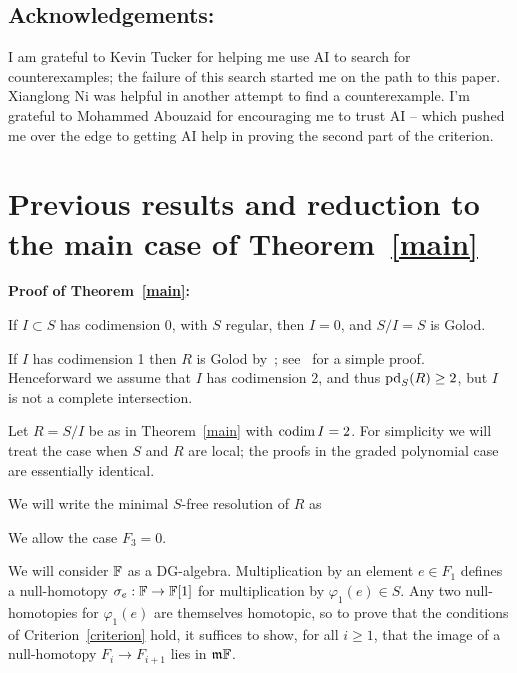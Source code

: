 \documentclass[11pt]{amsart}
\def\phi{{\varphi}}
\def\gm{{\mathfrak m}}
\begin{document}
\subsection{Acknowledgements: }\label{ack2} I am grateful to Kevin Tucker for helping me use AI to search for counterexamples; the failure
 of this search started me on the path to this paper. Xianglong Ni was
helpful in another attempt to find a counterexample. I'm grateful to Mohammed Abouzaid for encouraging me to
 trust AI -- which pushed me over the edge to getting AI help in proving the second part of the criterion.  
 
 \section{Previous results and reduction to the main case of Theorem~\ref{main}}\label{sec:start}
  
\noindent\textbf{Proof of Theorem~\ref{main}:}
 
 If $I\subset S$ has codimension 0, with $S$ regular, then $I=0$, and $S/I = S$ is Golod.
 
 If $I$ has codimension 1 then  $R$ is Golod by~\cite[Corollary 2 of Section 5]{Shamash}; see~\cite[Proposition 5.2.5]{AvramovInfinite} for a simple proof. Henceforward we assume
that $I$ has codimension 2, and thus $\operatorname{pd}_{S}(R) \geq 2$, but $I$ is not a complete intersection. 

Let $R = S/I$ be as in Theorem~\ref{main} with $\operatorname{codim} I = 2$. For simplicity we will treat the case when $S$ and $R$ are local; the proofs in the graded polynomial case are essentially identical.

 We will write the minimal $S$-free resolution of $R$ as
  \begin{center}
\end{center}
We allow the case $F_3=0$. 

We will consider ${\mathbb F}$ as a DG-algebra. Multiplication by an element $e\in F_{1}$
defines a null-homotopy $\sigma_{e}: {\mathbb F} \to {\mathbb F}[1]$ for multiplication by $\phi_{1}(e) \in S$. Any two null-homotopies for $\phi_{1}(e)$ are themselves homotopic, so to prove
that the conditions of Criterion~\ref{criterion} hold, it suffices to show, for all $i\geq 1$, that the image
of a null-homotopy $F_{i}\to F_{i+1}$  lies in $\gm \FF$.
\end{document}

